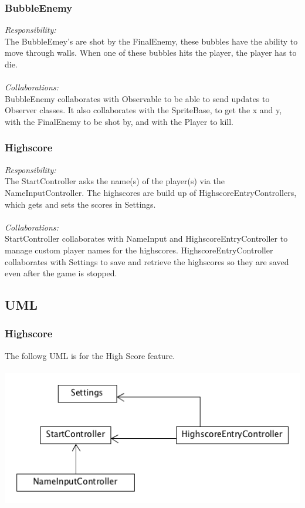 \subsubsection{BubbleEnemy}
\textit{Responsibility:} \\
The BubbleEmey's are shot by the FinalEnemy, these bubbles have the ability to move through walls. When one of these bubbles hits the player, the player has to die. \\ \\
\textit{Collaborations:} \\
BubbleEnemy collaborates with Observable to be able to send updates to Observer classes. It also collaborates with  the SpriteBase, to get the x and y, with the FinalEnemy to be shot by, and with the Player to kill.

\subsubsection{Highscore}
\textit{Responsibility:} \\
The StartController asks the name(s) of the player(s) via the NameInputController. The highscores are build up of HighscoreEntryControllers, which gets and sets the scores in Settings. \\ \\
\textit{Collaborations:} \\
StartController collaborates with NameInput and HighscoreEntryController to manage custom player names for the highscores. HighscoreEntryController collaborates with Settings to save and retrieve the highscores so they are saved even after the game is stopped.

\subsection{UML}

\subsubsection{Highscore}

The followg UML is for the High Score feature.
\\\\
\includegraphics[width=150mm]{HighscoreUML.png}


